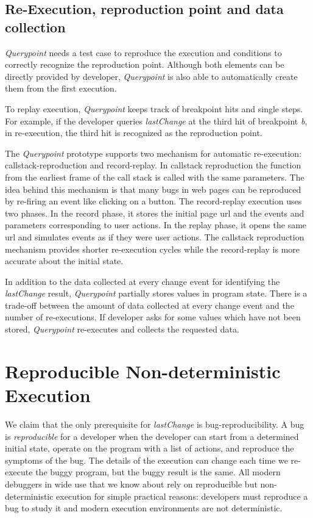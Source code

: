 \documentclass{sig-alternate}
\begin{document}
\subsection{Re-Execution, reproduction point and data collection}
\textit{Querypoint} needs a test case to reproduce the
execution and conditions to correctly recognize the reproduction point. 
Although both elements can be directly provided by developer, \textit{Querypoint}
is also able to automatically create them from the first execution. 

To replay execution, \textit{Querypoint} keeps track of breakpoint hits and single steps. For example, 
if the developer queries \textit{lastChange} at the third hit of breakpoint \textit{b}, in
re-execution, the third hit is recognized as the reproduction point. 

The \textit{Querypoint} prototype supports two mechanism
for automatic re-execution: callstack-reproduction and record-replay. In callstack reproduction the function from
the earliest frame of the call stack is called with the same parameters. The idea
behind this mechanism is that many bugs in web pages can be reproduced by re-firing
an event like clicking on a button. The record-replay execution uses two phases. In the record phase, it 
stores the initial page url and the events and parameters corresponding to user actions. In the replay phase, it opens
the same url and simulates events as if they were user actions. The callstack reproduction mechanism provides
shorter re-execution cycles while the record-replay is more accurate about the
initial state.

In addition to the data collected at every change event for identifying the \textit{lastChange}
result, \textit{Querypoint} partially stores values in program state. There is a trade-off between the amount of data collected at every change event and the number of re-executions. If developer asks for 
some values which have not been stored, \textit{Querypoint} re-executes and collects the requested data. 



\section{Reproducible Non-deterministic Execution}
We claim that the only prerequisite for \textit{lastChange}  is bug-reproducibility. 
A bug is \textit{reproducible} for a developer when the developer can
start from a determined initial state, operate on the program with a
list of actions, and reproduce the symptoms of the bug. The details of
the execution can change each time we re-execute the buggy program,
but the buggy result is the same.  All modern debuggers in wide use that we know 
about rely on reproducible but non-deterministic execution for simple practical reasons: 
developers must reproduce a bug to study it and modern execution environments 
are not deterministic.  
\end{document}

